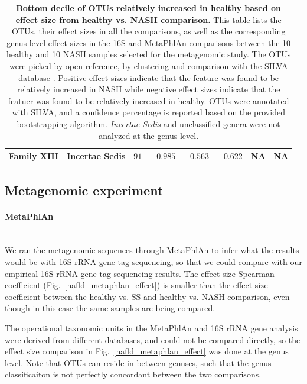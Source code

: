 \begin{table}[!ht]
\begin{tiny}
\begin{tabular}{|l|l|l|l|l|l|l|l|}
Family XIII & Incertae Sedis & $91$ & $-0.985$ & $-0.563$ & $-0.622$ & NA & NA \\ \hline
\end{tabular}
\end{tiny}
\caption{ \textbf{Bottom decile of OTUs relatively increased in healthy based on effect size from healthy vs. NASH comparison.} This table lists the OTUs, their effect sizes in all the comparisons, as well as the corresponding genus-level effect sizes in the 16S and MetaPhlAn comparisons between the 10 healthy and 10 NASH samples selected for the metagenomic study. The OTUs were picked by open reference, by clustering and comparison with the SILVA database \cite{quast2013silva}. Positive effect sizes indicate that the feature was found to be relatively increased in NASH while negative effect sizes indicate that the featuer was found to be relatively increased in healthy. OTUs were annotated with SILVA, and a confidence percentage is reported based on the provided bootstrapping algorithm. \textit{Incertae Sedis} and unclassified genera were not analyzed at the genus level.}
\label{nafld_bot_otu_table}
\end{table}


\FloatBarrier

\subsection{Metagenomic experiment}

\paragraph{MetaPhlAn}\mbox{}\\

We ran the metagenomic sequences through MetaPhlAn to infer what the results would be with 16S rRNA gene tag sequencing, so that we could compare with our empirical 16S rRNA gene tag sequencing results. The effect size Spearman coefficient (Fig.~\ref{nafld_metaphlan_effect}) is smaller than the effect size coefficient between the healthy vs. SS and healthy vs. NASH comparison, even though in this case the same samples are being compared.

The operational taxonomic units in the MetaPhlAn and 16S rRNA gene analysis were derived from different databases, and could not be compared directly, so the effect size comparison in Fig.~\ref{nafld_metaphlan_effect} was done at the genus level. Note that OTUs can reside in between genuses, such that the genus classificaiton is not perfectly concordant between the two comparisons.

